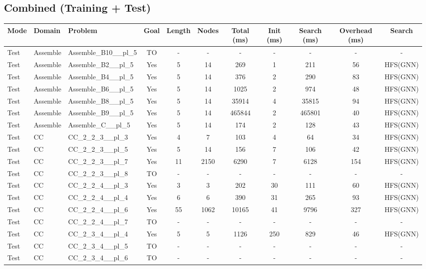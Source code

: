 \documentclass{article}
\begin{document}
\subsection*{Combined (Training + Test)}
\begin{tabular}{lllcccccccc}
\toprule
Mode & Domain & Problem & Goal & Length & Nodes & Total (ms) & Init (ms) & Search (ms) & Overhead (ms) & Search \\
\midrule
Test & Assemble & Assemble\_B10\_\_pl\_5 & TO & - & - & - & - & - & - & - \\
Test & Assemble & Assemble\_B2\_\_pl\_5 & Yes & 5 & 14 & 269 & 1 & 211 & 56 & HFS(GNN) \\
Test & Assemble & Assemble\_B4\_\_pl\_5 & Yes & 5 & 14 & 376 & 2 & 290 & 83 & HFS(GNN) \\
Test & Assemble & Assemble\_B6\_\_pl\_5 & Yes & 5 & 14 & 1025 & 2 & 974 & 48 & HFS(GNN) \\
Test & Assemble & Assemble\_B8\_\_pl\_5 & Yes & 5 & 14 & 35914 & 4 & 35815 & 94 & HFS(GNN) \\
Test & Assemble & Assemble\_B9\_\_pl\_5 & Yes & 5 & 14 & 465844 & 2 & 465801 & 40 & HFS(GNN) \\
Test & Assemble & Assemble\_C\_\_pl\_5 & Yes & 5 & 14 & 174 & 2 & 128 & 43 & HFS(GNN) \\
Test & CC & CC\_2\_2\_3\_\_pl\_3 & Yes & 4 & 7 & 103 & 4 & 64 & 34 & HFS(GNN) \\
Test & CC & CC\_2\_2\_3\_\_pl\_5 & Yes & 5 & 14 & 156 & 7 & 106 & 42 & HFS(GNN) \\
Test & CC & CC\_2\_2\_3\_\_pl\_7 & Yes & 11 & 2150 & 6290 & 7 & 6128 & 154 & HFS(GNN) \\
Test & CC & CC\_2\_2\_3\_\_pl\_8 & TO & - & - & - & - & - & - & - \\
Test & CC & CC\_2\_2\_4\_\_pl\_3 & Yes & 3 & 3 & 202 & 30 & 111 & 60 & HFS(GNN) \\
Test & CC & CC\_2\_2\_4\_\_pl\_4 & Yes & 6 & 6 & 390 & 31 & 265 & 93 & HFS(GNN) \\
Test & CC & CC\_2\_2\_4\_\_pl\_6 & Yes & 55 & 1062 & 10165 & 41 & 9796 & 327 & HFS(GNN) \\
Test & CC & CC\_2\_2\_4\_\_pl\_7 & TO & - & - & - & - & - & - & - \\
Test & CC & CC\_2\_3\_4\_\_pl\_4 & Yes & 5 & 5 & 1126 & 250 & 829 & 46 & HFS(GNN) \\
Test & CC & CC\_2\_3\_4\_\_pl\_5 & TO & - & - & - & - & - & - & - \\
Test & CC & CC\_2\_3\_4\_\_pl\_6 & TO & - & - & - & - & - & - & - \\

\end{tabular}
\end{document}
